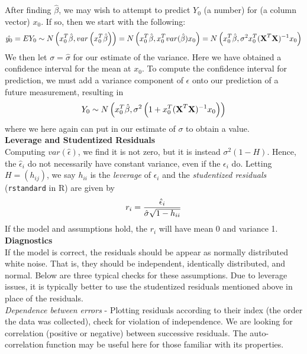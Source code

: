 \documentclass[11pt]{article}
\begin{document}
After finding $\hat{\beta}$, we may wish to attempt to predict $Y_0$ (a number) for (a column vector) $x_0$. If so, then we start with the following:
\begin{eqnarray}
\hat{y_0} = EY_0 \sim N\left(x_0^T\hat{\beta}, var\left(x_0^T\hat{\beta}\right)\right)
  = N\left(x_0^T\hat{\beta}, x_0^Tvar(\hat{\beta})x_0\right)
  = N\left(x_0^T\hat{\beta}, \sigma^2x_0^T(\textbf{X}^T\textbf{X})^{-1}x_0\right)  \notag
\end{eqnarray}
We then let $\sigma = \hat{\sigma}$ for our estimate of the variance. Here we have obtained a confidence interval for the mean at $x_0$. To compute the confidence interval for prediction, we must add a variance component of $\epsilon$ onto our prediction of a future measurement, resulting in
\begin{eqnarray}
Y_0 \sim N\left(x_0^T\hat{\beta}, \sigma^2\left(1 + x_0^T(\textbf{X}^T\textbf{X})^{-1}x_0\right)\right)  \notag
\end{eqnarray}
where we here again can put in our estimate of $\sigma$ to obtain a value. \\

\noindent\textbf{Leverage and Studentized Residuals}  \\

Computing $var(\hat{\epsilon})$, we find it is not zero, but it is instead $\sigma^2(1-H)$. Hence, the $\hat{\epsilon}_i$ do not necessarily have constant variance, even if the $\epsilon_i$ do. Letting $H=(h_{ij})$, we say $h_{ii}$ is the \textit{leverage} of $\epsilon_i$ and the \textit{studentized residuals} (\texttt{rstandard} in R) are given by
\begin{eqnarray}
r_i = \frac{\hat{\epsilon}_i}{\hat{\sigma}\sqrt{1-h_{ii}}} \notag
\end{eqnarray}
If the model and assumptions hold, the $r_i$ will have mean 0 and variance 1. \\

\noindent\textbf{Diagnostics}  \\

If the model is correct, the residuals should be appear as normally distributed white noise. That is, they should be independent, identically distributed, and normal. Below are three typical checks for these assumptions. Due to leverage issues, it is typically better to use the studentized residuals mentioned above in place of the residuals. \\

\noindent \textit{Dependence between errors} - Plotting residuals according to their index (the order the data was collected), check for violation of independence. We are looking for correlation (positive or negative) between successive residuals. The auto-correlation function may be useful here for those familiar with its properties. \\
\end{document}
